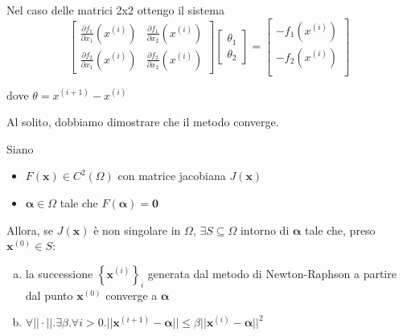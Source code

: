 \begin{example}
Nel caso delle matrici 2x2 ottengo il sistema
$$ \left[
\begin{array}{cc}
\frac{\partial f_1}{\partial x_1}(x^{(i)}) & \frac{\partial
  f_1}{\partial x_2}(x^{(i)}) \\ \frac{\partial f_2}{\partial
  x_1}(x^{(i)}) & \frac{\partial f_2}{\partial x_2}(x^{(i)})
\end{array} 
\right] \left[
\begin{array}{c}
\theta_1 \\ \theta_2
\end{array} 
\right] = \left[
\begin{array}{c}
 - f_1(x^{(i)}) \\ -f_2(x^{(i)}) \\
\end{array} 
\right]
$$

dove $ \theta = x^{(i+1)} - x^{(i)} $
\end{example}

Al solito, dobbiamo dimostrare che il metodo converge.

\begin{theo}
\label{theo:convergenza-newton-raphson}
Siano
\begin{itemize}
\item $ F(\mathbf{x}) \in C^2(\Omega) $ con matrice jacobiana $ J(\mathbf{x}) $
\item $ \mathbf{\alpha} \in \Omega $ tale che $ F(\mathbf{\alpha}) =\mathbf{0} $
\end{itemize}
Allora, se $ J(\mathbf{x}) $ \`e non singolare in $ \Omega $, $ \exists S
\subseteq \Omega $ intorno di $ \mathbf{\alpha} $ tale che, preso $ \mathbf{x}^{(0)} \in
S $:
\begin{enumerate}[(a)]
\item la successione $ \left\lbrace \mathbf{x}^{(i)} \right\rbrace_{i} $
  generata dal metodo di Newton-Raphson a partire dal punto
 $ \mathbf{x}^{(0)}$ converge a $ \mathbf{\alpha} $
\item $ \forall || \cdot ||.\exists \beta.\forall i > 0.|| \mathbf{x}^{(i+1)} -
  \mathbf{\alpha} || \leq \beta || \mathbf{x}^{(i)} - \mathbf{\alpha} ||^2 $
\end{enumerate}
\end{theo}

